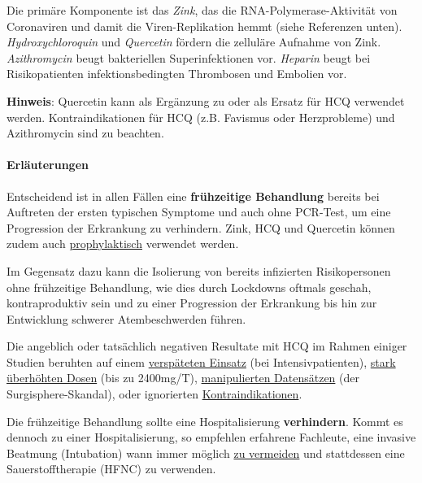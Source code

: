 Die primäre Komponente ist das \emph{Zink}, das die
RNA-Polymerase-Aktivität von Coronaviren und damit die Viren-Replikation
hemmt (siehe Referenzen unten). \emph{Hydroxychloroquin} und
\emph{Quercetin} fördern die zelluläre Aufnahme von Zink.
\emph{Azithromycin} beugt bakteriellen Superinfektionen vor.
\emph{Heparin} beugt bei Risikopatienten infektionsbedingten Thrombosen
und Embolien vor.

\textbf{Hinweis}: Quercetin kann als Ergänzung zu oder als Ersatz für
HCQ verwendet werden. Kontra­indi­kationen für HCQ (z.B. Favismus oder
Herzprobleme) und Azithromycin sind zu beachten.

\hypertarget{erluxe4uterungen}{%
\paragraph{Erläuterungen}\label{erluxe4uterungen}}

Entscheidend ist in allen Fällen eine \textbf{frühzeitige Behandlung}
bereits bei Auftreten der ersten typischen Symptome und auch ohne
PCR-Test, um eine Progression der Erkrankung zu verhindern. Zink, HCQ
und Quercetin können zudem auch
\href{https://www.mohfw.gov.in/pdf/AdvisoryontheuseofHydroxychloroquinasprophylaxisforSARSCoV2infection.pdf}{prophylaktisch}
verwendet werden.

Im Gegensatz dazu kann die Isolierung von bereits infizierten
Risikopersonen ohne frühzeitige Behandlung, wie dies durch Lockdowns
oftmals geschah, kontraproduktiv sein und zu einer Progression der
Erkrankung bis hin zur Entwicklung schwerer Atembeschwerden führen.

Die angeblich oder tatsächlich negativen Resultate mit HCQ im Rahmen
einiger Studien beruhten auf einem
\href{https://c19study.com/}{verspäteten Einsatz} (bei
Intensivpatienten),
\href{http://www.francesoir.fr/politique-monde/oxford-recovery-et-solidarity-overdosage-two-clinical-trials-acts-considered}{stark
überhöhten Dosen} (bis zu 2400mg/T),
\href{https://www.theguardian.com/world/2020/jun/03/covid-19-surgisphere-who-world-health-organization-hydroxychloroquine}{manipulierten
Datensätzen} (der Surgisphere-Skandal), oder ignorierten
\href{https://www.iss.it/documents/20126/0/Report+ISS+COVID-19_14.pdf/8a94daca-f6eb-ae95-dad7-68b9c03c8fb6}{Kontraindikationen}.

Die frühzeitige Behandlung sollte eine Hospitalisierung
\textbf{verhindern}. Kommt es dennoch zu einer Hospitalisierung, so
empfehlen erfahrene Fachleute, eine invasive Beatmung (Intubation) wann
immer möglich
\href{https://www.evms.edu/covid-19/covid_care_for_clinicians/}{zu
vermeiden} und stattdessen eine Sauerstofftherapie (HFNC) zu verwenden.

